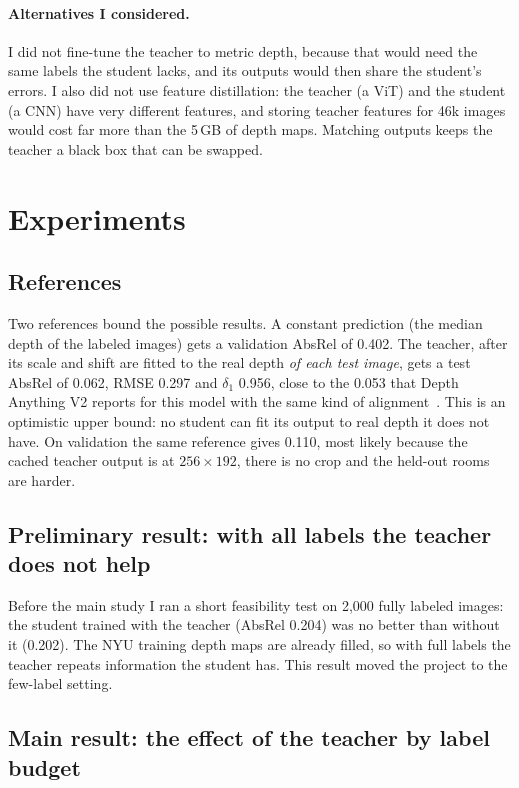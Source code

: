 \documentclass[11pt]{article}
\begin{document}
\paragraph{Alternatives I considered.} I did not fine-tune the teacher to metric depth, because
that would need the same labels the student lacks, and its outputs would then share the student's
errors. I also did not use feature distillation: the teacher (a ViT) and the student (a CNN) have
very different features, and storing teacher features for 46k images would cost far more than
the 5\,GB of depth maps. Matching outputs keeps the teacher a black box that can be swapped.

\section{Experiments}

\subsection{References}

Two references bound the possible results. A constant prediction (the median depth of the labeled
images) gets a validation AbsRel of 0.402. The teacher, after its scale and shift are fitted to the
real depth \emph{of each test image}, gets a test AbsRel of 0.062, RMSE 0.297 and $\delta_1$ 0.956,
close to the 0.053 that Depth Anything V2 reports for this model with the same kind of
alignment~\cite{yang2024dav2}. This is an optimistic upper bound: no student can fit its output to
real depth it does not have. On validation the same reference gives 0.110, most likely because the
cached teacher output is at $256\times192$, there is no crop and the held-out rooms are harder.

\subsection{Preliminary result: with all labels the teacher does not help}

Before the main study I ran a short feasibility test on 2,000 fully labeled images: the student
trained with the teacher (AbsRel 0.204) was no better than without it (0.202). The NYU training
depth maps are already filled, so with full labels the teacher repeats information the student has.
This result moved the project to the few-label setting.

\subsection{Main result: the effect of the teacher by label budget}
\end{document}
